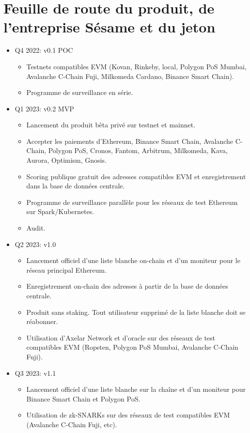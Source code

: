 ﻿\documentclass[a4paper]{article}
\begin{document}
\newpage
\section{Feuille de route du produit, de l’entreprise Sésame et du jeton }

\begin{itemize}
\item
Q4 2022:  v0.1 POC
    \begin{itemize}
    \item Testnets compatibles EVM (Kovan, Rinkeby, local, Polygon PoS Mumbai, Avalanche C-Chain Fuji, Milkomeda Cardano, Binance Smart Chain). 
    \item Programme de surveillance en série. 
    \end{itemize}

\item
Q1 2023: v0.2 MVP
    \begin{itemize}
    \item Lancement du produit bêta privé sur testnet et mainnet.
    \item Accepter les paiements d'Ethereum, Binance Smart Chain, Avalanche C-Chain, Polygon PoS, Cronos, Fantom, Arbitrum, Milkomeda, Kava, Aurora, Optimism, Gnosis. 
    \item Scoring publique gratuit des adresses compatibles EVM et enregistrement dans la base de données centrale.
    \item Programme de surveillance parallèle pour les r\'eseaux de test Ethereum sur Spark/Kubernetes.
    \item Audit.
    \end{itemize}

\item
Q2 2023: v1.0
    \begin{itemize}
    \item Lancement officiel d'une liste blanche on-chain et d'un moniteur pour le réseau principal Ethereum.
    \item Enregistrement on-chain des adresses à partir de la base de données centrale.
    \item Produit sans staking. Tout utilisateur supprimé de la liste blanche doit se réabonner.
    \item Utilisation d'Axelar Network et d'oracle sur des réseaux de test compatibles EVM (Ropsten, Polygon PoS Mumbai, Avalanche C-Chain Fuji).
    \end{itemize}

\item
Q3 2023: v1.1
    \begin{itemize}
    \item Lancement officiel d'une liste blanche sur la chaîne et d'un moniteur pour Binance Smart Chain et Polygon PoS.
    \item Utilisation de zk-SNARKs sur des réseaux de test compatibles EVM (Avalanche C-Chain Fuji, etc). 
    \end{itemize}


\end{itemize}
\end{document}
